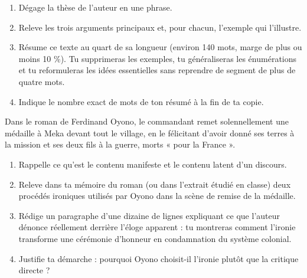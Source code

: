 \documentclass[11pt]{article}
\begin{document}
\begin{exercice}
\begin{enumerate}
\item Dégage la thèse de l'auteur en une phrase.
\item Releve les trois arguments principaux et, pour chacun, l'exemple qui l'illustre.
\item Résume ce texte au quart de sa longueur (environ 140 mots, marge de plus ou moins 10 \%). Tu supprimeras les exemples, tu généraliseras les énumérations et tu reformuleras les idées essentielles sans reprendre de segment de plus de quatre mots.
\item Indique le nombre exact de mots de ton résumé à la fin de ta copie.
\end{enumerate}
\end{exercice}

\begin{exercice}
Dans le roman de Ferdinand Oyono, le commandant remet solennellement une médaille à Meka devant tout le village, en le félicitant d'avoir donné ses terres à la mission et ses deux fils à la guerre, morts « pour la France ».
\begin{enumerate}
\item Rappelle ce qu'est le contenu manifeste et le contenu latent d'un discours.
\item Releve dans ta mémoire du roman (ou dans l'extrait étudié en classe) deux procédés ironiques utilisés par Oyono dans la scène de remise de la médaille.
\item Rédige un paragraphe d'une dizaine de lignes expliquant ce que l'auteur dénonce réellement derrière l'éloge apparent : tu montreras comment l'ironie transforme une cérémonie d'honneur en condamnation du système colonial.
\item Justifie ta démarche : pourquoi Oyono choisit-il l'ironie plutôt que la critique directe ?
\end{enumerate}
\end{exercice}
\end{document}
